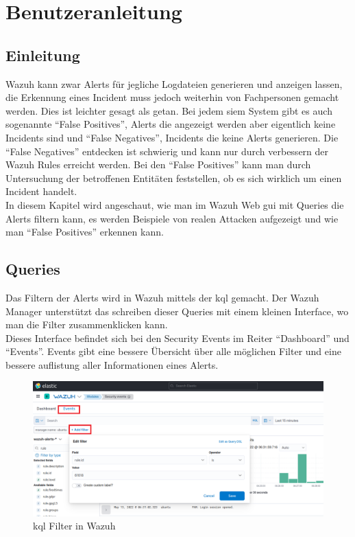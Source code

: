 \chapter{Benutzeranleitung}
\section{Einleitung}
Wazuh kann zwar Alerts für jegliche Logdateien generieren und anzeigen lassen, die Erkennung eines Incident muss jedoch weiterhin von Fachpersonen gemacht werden.
Dies ist leichter gesagt als getan.
Bei jedem \acrshort{siem} System gibt es auch sogenannte ``False Positives'', Alerts die angezeigt werden aber eigentlich keine Incidents sind und ``False Negatives'', Incidents die keine Alerts generieren.
Die ``False Negatives'' entdecken ist schwierig und kann nur durch verbessern der Wazuh Rules erreicht werden.
Bei den ``False Positives'' kann man durch Untersuchung der betroffenen Entitäten feststellen, ob es sich wirklich um einen Incident handelt.\\

In diesem Kapitel wird angeschaut, wie man im Wazuh Web \acrshort{gui} mit Queries die Alerts filtern kann, es werden Beispiele von realen Attacken aufgezeigt und wie man ``False Positives'' erkennen kann.

\section{Queries}
Das Filtern der Alerts wird in Wazuh mittels der \acrfull{kql} gemacht.
Der Wazuh Manager unterstützt das schreiben dieser Queries mit einem kleinen Interface, wo man die Filter zusammenklicken kann.\\

Dieses Interface befindet sich bei den Security Events im Reiter ``Dashboard'' und ``Events''.
Events gibt eine bessere Übersicht über alle möglichen Filter und eine bessere auflistung aller Informationen eines Alerts.
\begin{figure}[H]
    \centering
    \includegraphics[width=\linewidth]{../img/filter.png}
    \caption{\acrshort{kql} Filter in Wazuh}
\end{figure}

